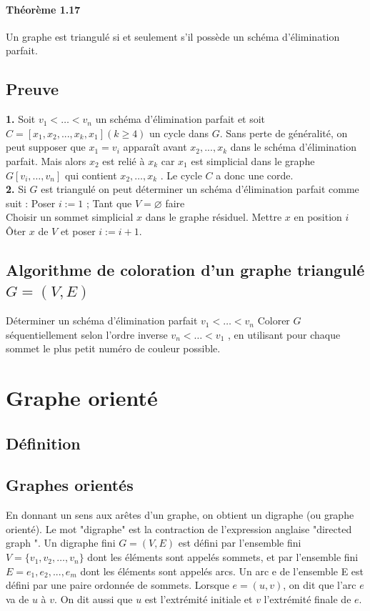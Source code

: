 \paragraph*{Théorème 1.17}
Un graphe est triangulé si et seulement s'il possède un schéma d'élimination parfait.

\subsection*{Preuve}
\noindent \textbf{1.} Soit $ v_{1} < \dots < v_{n} $ un schéma d'élimination parfait et soit $ C = [x_{1} , x_{2}, . . . , x_{k}, x_{1}] (k \geq 4) $
un cycle dans $ G $. Sans perte de généralité, on peut supposer que $  x_{1} = v_{i}$ apparaît avant
$ x_{2}, . . . , x_{k} $ dans le schéma d'élimination parfait. Mais alors $ x_{2} $ est relié à $ x_{k} $ car $ x_{1} $ est
simplicial dans le graphe $ G[v_{i}, \dots , v_{n} ] $ qui contient $ x_{2} , \dots , x_{k} $ . Le cycle $ C $ a donc une
corde.\\
\textbf{2.} Si $ G $ est triangulé on peut déterminer un schéma d'élimination parfait comme suit :
Poser $ i :=1 $ ;
Tant que $ V = \varnothing $ faire\\
Choisir un sommet simplicial $ x $ dans le graphe résiduel. Mettre $ x $ en position $ i $\\
Ôter $ x $ de $ V $ et poser $ i := i + 1 $.

\subsection*{Algorithme de coloration d’un graphe triangulé $ G = (V,E) $}
Déterminer un schéma d’élimination parfait $ v_{1} < \dots < v_{n} $
Colorer $ G $ séquentiellement selon l'ordre inverse $ v_{n} < \dots < v_{1} $ , en utilisant pour chaque
sommet le plus petit numéro de couleur possible.

\section{Graphe orienté}
\subsection{Définition}
\subsection{Graphes orientés}
En donnant un sens aux arêtes d'un graphe, on obtient un digraphe (ou graphe orienté).
Le mot "digraphe" est la contraction de l'expression anglaise "directed graph ".
Un digraphe fini $  G = (V, E) $ est défini par l’ensemble fini $ V = \{v_{1}, v_{2} , \dots , v_{n} \} $ dont 
les éléments sont appelés sommets, et par l'ensemble fini $ E = {e_{1} , e_{2} , . . . , e_{m} } $ dont les éléments
sont appelés arcs.
Un arc e de l'ensemble E est défini par une paire ordonnée de sommets. Lorsque $ e = (u, v) $,
on dit que l'arc $ e $ va de $ u $ à $ v $. On dit aussi que $ u $ est l'extrémité initiale et $ v $ l'extrémité
finale de $ e $.
